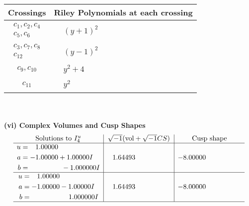 \documentclass[1p]{elsarticle_modified}
\theoremstyle{definition}
\newcommand{\I}{\sqrt{-1}}
\begin{document}
\begin{tabular}{m{50pt}|m{274pt}}
Crossings & \hspace{64pt}Riley Polynomials at each crossing \\
\hline $$\begin{aligned}c_{1},c_{2},c_{4}\\c_{5},c_{6}\end{aligned}$$&$\begin{aligned}
&(y+1)^2
\end{aligned}$\\
\hline $$\begin{aligned}c_{3},c_{7},c_{8}\\c_{12}\end{aligned}$$&$\begin{aligned}
&(y-1)^2
\end{aligned}$\\
\hline $$\begin{aligned}c_{9},c_{10}\end{aligned}$$&$\begin{aligned}
&y^2+4
\end{aligned}$\\
\hline $$\begin{aligned}c_{11}\end{aligned}$$&$\begin{aligned}
&y^2
\end{aligned}$\\
\hline
\end{tabular}\\~\\
\newpage\flushleft \textbf{(vi) Complex Volumes and Cusp Shapes}
$$\begin{array}{c|c|c}  
\text{Solutions to }I^u_{4}& \I (\text{vol} + \sqrt{-1}CS) & \text{Cusp shape}\\
 \hline 
\begin{aligned}
u &= \phantom{-}1.00000\phantom{ +0.000000I} \\
a &= -1.00000 + 1.00000 I \\
b &= \phantom{-0.000000 } -1.000000 I\end{aligned}
 & \phantom{-}1.64493\phantom{ +0.000000I} & -8.00000\phantom{ +0.000000I} \\ \hline\begin{aligned}
u &= \phantom{-}1.00000\phantom{ +0.000000I} \\
a &= -1.00000 - 1.00000 I \\
b &= \phantom{-0.000000 -}1.000000 I\end{aligned}
 & \phantom{-}1.64493\phantom{ +0.000000I} & -8.00000\phantom{ +0.000000I}\\
 \hline 
 \end{array}$$\newpage\newpage\renewcommand{\arraystretch}{1}
\end{document}
